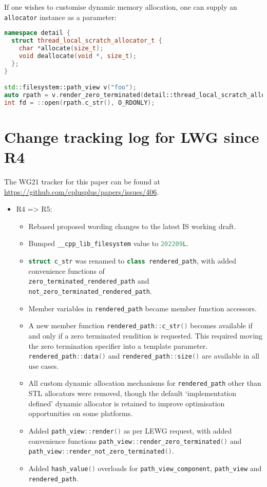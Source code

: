 \documentclass[11pt]{article}
\newcommand{\code}[2][cpp]{\lstinline[language=#1,basicstyle=\small\ttfamily]{#2}}
\begin{document}
\begin{itemize}
    If one wishes to customise dynamic memory allocation, one can supply an \code{allocator} instance as a parameter:

    \begin{lstlisting}[language=cpp]
namespace detail {
  struct thread_local_scratch_allocator_t {
    char *allocate(size_t);
    void deallocate(void *, size_t);
  };
}

std::filesystem::path_view v("foo");
auto rpath = v.render_zero_terminated(detail::thread_local_scratch_allocator_t{});
int fd = ::open(rpath.c_str(), O_RDONLY);
    \end{lstlisting}
\end{itemize}

\section{Change tracking log for LWG since R4}

The WG21 tracker for this paper can be found at \url{https://github.com/cplusplus/papers/issues/406}.

\begin{itemize}
    \item R4 => R5:
    \begin{itemize}
        \item Rebased proposed wording changes to the latest IS working draft.
        \item Bumped \code{__cpp_lib_filesystem} value to \code{202209L}.
        \item \code{struct c_str} was renamed to \code{class rendered_path}, with added convenience functions of \\
        \code{zero_terminated_rendered_path} and \code{not_zero_terminated_rendered_path}.
        \item Member variables in \code{rendered_path} became member function accessors.
        \item A new member function \code{rendered_path::c_str()} becomes available if and only if a zero terminated rendition is requested. This required moving the zero termination specifier into a template parameter. \code{rendered_path::data()} and \code{rendered_path::size()} are available in all use cases.
        \item All custom dynamic allocation mechanisms for \code{rendered_path} other than STL allocators were removed, though the default `implementation defined' dynamic allocator is retained to improve optimisation opportunities on some platforms.
        \item Added \code{path_view::render()} as per LEWG request, with added convenience functions \code{path_view::render_zero_terminated()} and \code{path_view::render_not_zero_terminated()}.
        \item Added \code{hash_value()} overloads for \code{path_view_component}, \code{path_view} and \code{rendered_path}.
    \end{itemize}
\end{itemize}
\end{document}
